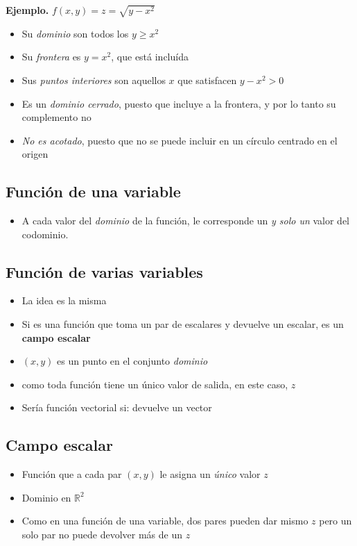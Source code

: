 \textbf{Ejemplo.}
\(f(x,y) = z = \sqrt{y-x^{2}}\)

\begin{itemize}
    \item Su \textit{dominio} son todos los \(y \geq x^{2}\)
    \item Su \textit{frontera} es \(y = x^{2}\), que está incluída
    \item Sus \textit{puntos interiores} son aquellos \(x\) que satisfacen
          \(y - x^{2} > 0\)
    \item Es un \textit{dominio cerrado}, puesto que incluye a la frontera,
          y por lo tanto su complemento no
    \item \textit{No es acotado}, puesto que no se puede incluir en un círculo
          centrado en el origen
\end{itemize}

\subsection{Función de una variable}

\begin{itemize}
    \item A cada valor del \textit{dominio} de la función,
          le corresponde un \textit{y solo un} valor del codominio.
\end{itemize}

\subsection{Función de varias variables}
\begin{itemize}
    \item La idea es la misma
    \item Si es una función que toma un par de escalares y devuelve un escalar,
          es un \textbf{campo escalar}
    \item \((x,y)\) es un punto en el conjunto \textit{dominio}
    \item como toda función tiene un único valor de salida, en este caso, \(z\)
    \item Sería función vectorial si: devuelve un vector
\end{itemize}

\subsection{Campo escalar}
\begin{itemize}
    \item Función que a cada par \((x,y)\) le asigna un \textit{único} valor \(z\)
    \item Dominio en \(\mathbb{R}^{2}\)
    \item Como en una función de una variable, dos pares pueden dar mismo \(z\)
          pero un solo par no puede devolver más de un \(z\)
\end{itemize}

